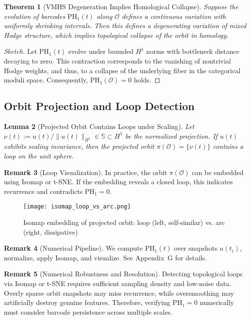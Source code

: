 \documentclass[11pt]{article}
\newtheorem{theorem}{Theorem}[section]
\newtheorem{lemma}[theorem]{Lemma}
\theoremstyle{definition}
\newtheorem{remark}[theorem]{Remark}
\begin{document}
\begin{theorem}[VMHS Degeneration Implies Homological Collapse]
Suppose the evolution of barcodes $\mathrm{PH}_1(t)$ along $\mathcal{O}$ defines a continuous variation with uniformly shrinking intervals. Then this defines a degenerating variation of mixed Hodge structure, which implies topological collapse of the orbit in homology.
\end{theorem}

\begin{proof}[Sketch]
Let $\mathrm{PH}_1(t)$ evolve under bounded $H^1$ norms with bottleneck distance decaying to zero. This contraction corresponds to the vanishing of nontrivial Hodge weights, and thus, to a collapse of the underlying fiber in the categorical moduli space. Consequently, $\mathrm{PH}_1(\mathcal{O}) = 0$ holds.
\end{proof}

\subsection{Orbit Projection and Loop Detection}

\begin{lemma}[Projected Orbit Contains Loops under Scaling]
Let $\nu(t) := u(t)/\|u(t)\|_{H^1} \in \mathbb{S} \subset H^1$ be the normalized projection. If $u(t)$ exhibits scaling invariance, then the projected orbit $\pi(\mathcal{O}) = \{ \nu(t) \}$ contains a loop on the unit sphere.
\end{lemma}

\begin{remark}[Loop Visualization]
In practice, the orbit $\pi(\mathcal{O})$ can be embedded using Isomap or t-SNE. If the embedding reveals a closed loop, this indicates recurrence and contradicts $\mathrm{PH}_1 = 0$.
\end{remark}

\begin{figure}[h]
  \centering
  \texttt{[image: isomap\_loop\_vs\_arc.png]}
  \caption{Isomap embedding of projected orbit: loop (left, self-similar) vs. arc (right, dissipative)}
\end{figure}

\begin{remark}[Numerical Pipeline]
We compute $\mathrm{PH}_1(t)$ over snapshots $u(t_i)$, normalize, apply Isomap, and visualize. See Appendix~G for details.
\end{remark}

\begin{remark}[Numerical Robustness and Resolution]
Detecting topological loops via Isomap or t-SNE requires sufficient sampling density and low-noise data. Overly sparse orbit snapshots may miss recurrence, while oversmoothing may artificially destroy genuine features. Therefore, verifying $\mathrm{PH}_1 = 0$ numerically must consider barcode persistence across multiple scales.
\end{remark}
\end{document}

